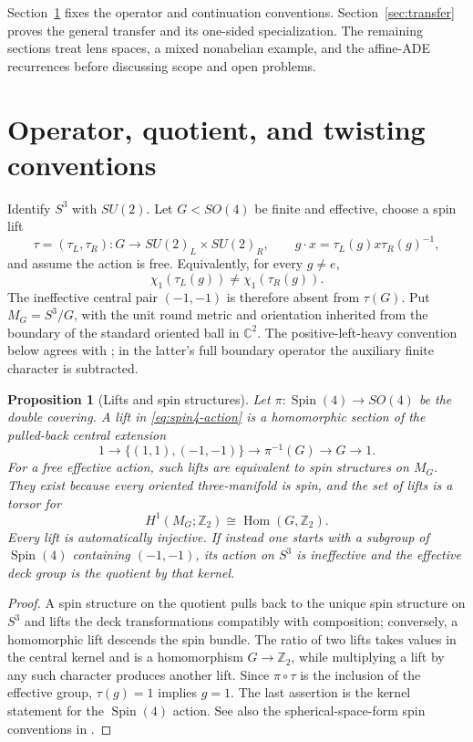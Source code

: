 \documentclass[11pt]{article}
\newtheorem{proposition}[theorem]{Proposition}
\theoremstyle{definition}
\DeclareMathOperator{\Hom}{Hom}
\begin{document}
Section~\ref{sec:conventions} fixes the operator and continuation conventions.
Section~\ref{sec:transfer} proves the general transfer and its one-sided
specialization.  The remaining sections treat lens spaces, a mixed
nonabelian example, and the affine-ADE recurrences before discussing scope and
open problems.

\section{Operator, quotient, and twisting conventions}
\label{sec:conventions}

Identify $S^3$ with $SU(2)$.  Let $G<SO(4)$ be finite and effective, choose a
spin lift
\begin{equation}
 \tau=(\tau_L,\tau_R):G\longrightarrow SU(2)_L\times SU(2)_R,
 \qquad
 g\cdot x=\tau_L(g)x\tau_R(g)^{-1},
 \label{eq:spin4-action}
\end{equation}
and assume the action is free.  Equivalently, for every $g\ne e$,
\begin{equation}
 \chi_1(\tau_L(g))\ne\chi_1(\tau_R(g)).
 \label{eq:freeness-character}
\end{equation}
The ineffective central pair $(-1,-1)$ is therefore absent from $\tau(G)$.
Put $M_G=S^3/G$, with the unit round metric and orientation inherited
from the boundary of the standard oriented ball in $\mathbb C^2$.
The positive-left-heavy convention below agrees with
\cite{MahmoodP1Collection2026,MahmoodP7Collection2026}; in the latter's
full boundary operator the auxiliary finite character is subtracted.

\begin{proposition}[Lifts and spin structures]
\label{prop:spin-lifts}
Let $\pi:\operatorname{Spin}(4)\to SO(4)$ be the double covering.  A lift in
\eqref{eq:spin4-action} is a homomorphic section of the pulled-back central
extension
\[
 1\longrightarrow\{(1,1),(-1,-1)\}
 \longrightarrow\pi^{-1}(G)\longrightarrow G\longrightarrow1.
\]
For a free effective action, such lifts are equivalent to spin structures on
$M_G$.  They exist because every oriented three-manifold is spin, and the set
of lifts is a torsor for
\[
 H^1(M_G;\mathbb Z_2)\cong\Hom(G,\mathbb Z_2).
\]
Every lift is automatically injective.  If instead one starts with a
subgroup of $\operatorname{Spin}(4)$ containing $(-1,-1)$, its action on $S^3$ is
ineffective and the effective deck group is the quotient by that kernel.
\end{proposition}

\begin{proof}
A spin structure on the quotient pulls back to the unique spin structure on
$S^3$ and lifts the deck transformations compatibly with composition;
conversely, a homomorphic lift descends the spin bundle.  The ratio of two
lifts takes values in the central kernel and is a homomorphism
$G\to\mathbb Z_2$, while multiplying a lift by any such character produces
another lift.  Since $\pi\circ\tau$ is the inclusion of the effective group,
$\tau(g)=1$ implies $g=1$.  The last assertion is the kernel statement for
the $\operatorname{Spin}(4)$ action.  See also the spherical-space-form spin conventions in
\cite{Bar1992,Bar1996}.
\end{proof}
\end{document}
